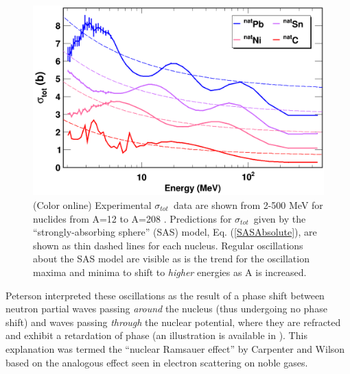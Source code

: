 \documentclass[twocolumn,secnumarabic,amssymb, nobibnotes, aps, prl,
superscriptaddress, nobalancelastpage]{revtex4}
\newcommand{\tot}{\ensuremath{\sigma_{tot}}}
\begin{document}
\begin{figure}
    \includegraphics[width=\linewidth]{figures/ExampleTCS.png}
    \caption{
        (Color online) Experimental \tot\ data are shown from 2-500
        MeV for nuclides from A=12 to A=208
        \cite{Finlay1993, Schwartz1974, Poenitz1983, Abfalterer2000, Abfalterer2001}.
        Predictions for \tot\ given by the ``strongly-absorbing sphere'' (SAS)
        model, Eq. (\ref{SASAbsolute}), are shown as thin dashed lines for each nucleus.
        Regular oscillations about the SAS model are visible
        as is the trend for the oscillation
        maxima and minima to shift to \textit{higher} energies as A is increased.
    }
    \label{SASphereVsExperiment}
\end{figure}
Peterson \cite{Peterson1962} interpreted these oscillations as the 
result of a phase shift between neutron partial waves passing \textit{around} the 
nucleus (thus undergoing no phase shift) and waves passing
\textit{through} the nuclear potential, where they are refracted and exhibit a 
retardation of phase (an illustration is available in \cite{Satchler1980}).
This explanation was termed the 
``nuclear Ramsauer effect'' by Carpenter and Wilson \cite{Carpenter1959} based on 
the analogous effect seen in electron scattering on noble gases.
\end{document}
